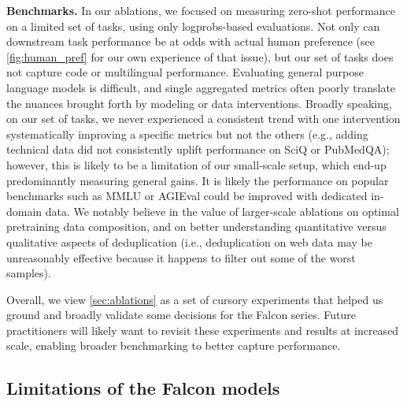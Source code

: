 \documentclass{article}
\begin{document}
\textbf{Benchmarks.} In our ablations, we focused on measuring zero-shot performance on a limited set of tasks, using only logprobs-based evaluations. Not only can downstream task performance be at odds with actual human preference (see \cref{fig:human_pref} for our own experience of that issue), but our set of tasks does not capture code or multilingual performance. Evaluating general purpose language models is difficult, and single aggregated metrics often poorly translate the nuances brought forth by modeling or data interventions. Broadly speaking, on our set of tasks, we never experienced a consistent trend with one intervention systematically improving a specific metrics but not the others (e.g., adding technical data did not consistently uplift performance on SciQ or PubMedQA); however, this is likely to be a limitation of our small-scale setup, which end-up predominantly measuring general gains. It is likely the performance on popular benchmarks such as MMLU \citep{hendrycks2020measuring} or AGIEval \citep{zhong2023agieval} could be improved with dedicated in-domain data. We notably believe in the value of larger-scale ablations on optimal pretraining data composition, and on better understanding quantitative versus qualitative aspects of deduplication (i.e., deduplication on web data may be unreasonably effective because it happens to filter out some of the worst samples). 

Overall, we view \cref{sec:ablations} as a set of cursory experiments that helped us ground and broadly validate some decisions for the Falcon series. Future practitioners will likely want to revisit these experiments and results at increased scale, enabling broader benchmarking to better capture performance.


\subsection{Limitations of the Falcon models}
\end{document}
